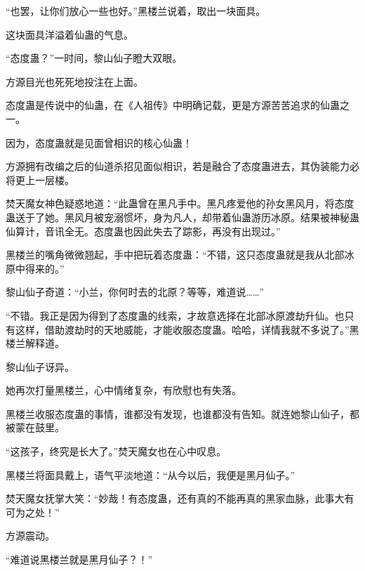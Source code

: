 \begin{this_body}
“也罢，让你们放心一些也好。”黑楼兰说着，取出一块面具。

这块面具洋溢着仙蛊的气息。

“态度蛊？”一时间，黎山仙子瞪大双眼。

方源目光也死死地投注在上面。

态度蛊是传说中的仙蛊，在《人祖传》中明确记载，更是方源苦苦追求的仙蛊之一。

因为，态度蛊就是见面曾相识的核心仙蛊！

方源拥有改编之后的仙道杀招见面似相识，若是融合了态度蛊进去，其伪装能力必将更上一层楼。

焚天魔女神色疑惑地道：“此蛊曾在黑凡手中。黑凡疼爱他的孙女黑风月，将态度蛊送于了她。黑风月被宠溺惯坏，身为凡人，却带着仙蛊游历冰原。结果被神秘蛊仙算计，音讯全无。态度蛊也因此失去了踪影，再没有出现过。”

黑楼兰的嘴角微微翘起，手中把玩着态度蛊：“不错，这只态度蛊就是我从北部冰原中得来的。”

黎山仙子奇道：“小兰，你何时去的北原？等等，难道说……”

“不错。我正是因为得到了态度蛊的线索，才故意选择在北部冰原渡劫升仙。也只有这样，借助渡劫时的天地威能，才能收服态度蛊。哈哈，详情我就不多说了。”黑楼兰解释道。

黎山仙子讶异。

她再次打量黑楼兰，心中情绪复杂，有欣慰也有失落。

黑楼兰收服态度蛊的事情，谁都没有发现，也谁都没有告知。就连她黎山仙子，都被蒙在鼓里。

“这孩子，终究是长大了。”焚天魔女也在心中叹息。

黑楼兰将面具戴上，语气平淡地道：“从今以后，我便是黑月仙子。”

焚天魔女抚掌大笑：“妙哉！有态度蛊，还有真的不能再真的黑家血脉，此事大有可为之处！”

方源震动。

“难道说黑楼兰就是黑月仙子？！”

\end{this_body}

